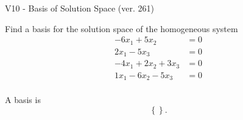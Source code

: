 \begin{exercise}
  \begin{exerciseTitle}V10 - Basis of Solution Space (ver. 261)\end{exerciseTitle}
  \begin{exerciseStatement}
    Find a basis for the solution space of the homogeneous system 
\begin{align*}
 -6 x_ 1 + 5 x_ 2 &= 0  \\ 
  2 x_ 1 -5 x_ 3 &= 0  \\ 
  -4 x_ 1 + 2 x_ 2 + 3 x_ 3 &= 0  \\ 
  1 x_ 1 -6 x_ 2 -5 x_ 3 &= 0  \\ 
 \end{align*}


 
  \end{exerciseStatement}

  \begin{exerciseAnswer}
   A basis is   
\[\left\{\right\}.\]

  


  \end{exerciseAnswer}
\end{exercise}
